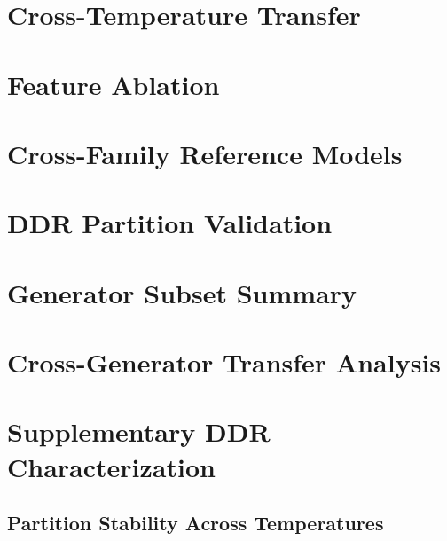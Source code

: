 \documentclass[11pt]{article}
\begin{document}
\section{Cross-Temperature Transfer}
\label{app:cross-temp}


\section{Feature Ablation}
\label{app:ablation-table}




\section{Cross-Family Reference Models}
\label{app:cross-ref}








\section{DDR Partition Validation}
\label{app:ddr-validation}


\section{Generator Subset Summary}
\label{app:gen-subsets-section}




\section{Cross-Generator Transfer Analysis}
\label{app:transfer}


\vspace{-2mm}
\section{Supplementary DDR Characterization}
\label{app:ddr-supplement}
\vspace{-2mm}

\subsection{Partition Stability Across Temperatures}
\label{app:ddr-temp-stability}

\end{document}
